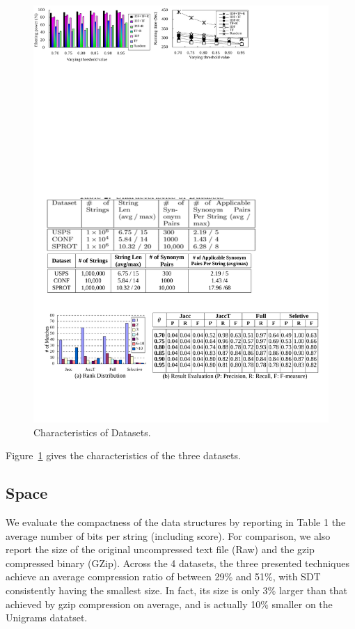 \documentclass{sig-alternate}
\begin{document}
\begin{figure}
  \small
  \centering
  \includegraphics[width=\linewidth]{figures/Characteristics_Datasets}
   \vspace{-6mm}
  \caption{Characteristics of Datasets.}
  \label{tab:data_characteristics}
\end{figure}


Figure~\ref{tab:data_characteristics} gives the characteristics of the
three datasets.


\subsection{Space}

We evaluate the compactness of the data structures by
reporting in Table 1 the average number of bits per string
(including score). For comparison, we also report the size
of the original uncompressed text file (Raw) and the gzip
compressed binary (GZip). Across the 4 datasets, the three
presented techniques achieve an average compression ratio
of between 29\% and 51\%, with SDT consistently having the
smallest size. In fact, its size is only 3\% larger than that
achieved by gzip compression on average, and is actually
10\% smaller on the Unigrams datatset.
\end{document}
